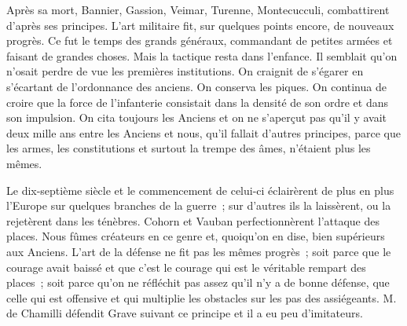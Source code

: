 \documentclass[french,twoside]{book} %
\begin{document}
Après sa mort, Bannier, Gassion, Veimar, Turenne, Montecucculi, combattirent d’après ses principes. L’art militaire fit, sur quelques points encore, de nouveaux progrès. Ce fut le temps des grands généraux, commandant de petites armées et faisant de grandes choses. Mais la tactique resta dans l’enfance. Il semblait qu’on n’osait perdre de vue les premières institutions. On craignit de s’égarer en s’écartant de l’ordonnance des anciens. On conserva les piques. On continua de croire que la force de l’infanterie consistait dans la densité de son ordre et dans son impulsion. On cita toujours les Anciens et on ne s’aperçut pas qu’il y avait deux mille ans entre les Anciens et nous, qu’il fallait d’autres principes, parce que les armes, les constitutions et surtout la trempe des âmes, n’étaient plus les mêmes.\par
Le dix-septième siècle et le commencement de celui-ci éclairèrent de plus en plus l’Europe sur quelques branches de la guerre ; sur d’autres ils la laissèrent, ou la rejetèrent dans les ténèbres. Cohorn et Vauban perfectionnèrent l’attaque des places. Nous fûmes créateurs en ce genre et, quoiqu’on en dise, bien supérieurs aux Anciens. L’art de la défense ne fit pas les mêmes progrès ; soit parce que le courage avait baissé et que c’est le courage qui est le véritable rempart des places ; soit parce qu’on ne réfléchit pas assez qu’il n’y a de bonne défense, que celle qui est offensive et qui multiplie les obstacles sur les pas des assiégeants. M. de Chamilli défendit Grave suivant ce principe et il a eu peu d’imitateurs.\par
\end{document}
